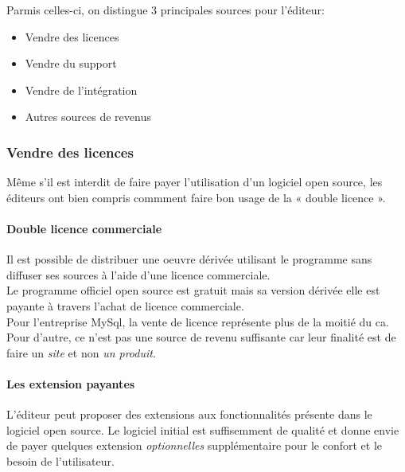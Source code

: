 			Parmis celles-ci, on distingue 3 principales sources pour l'éditeur:

			\begin{itemize}[label=\textbullet, font=\LARGE \color{burntorange}]
				\item Vendre des licences
				\item Vendre du support
				\item Vendre de l'intégration
				\item Autres sources de revenus
			\end{itemize}

			\subsubsection{Vendre des licences}

			Même s'il est interdit de faire payer l'utilisation d'un logiciel open source, les éditeurs ont bien compris commment faire bon usage de la « double licence ».

			\paragraph{Double licence commerciale\\}

			Il est possible de distribuer une oeuvre dérivée utilisant le programme sans diffuser ses sources à l'aide d'une licence commerciale.\\
			Le programme officiel open source est gratuit mais sa version dérivée elle est payante à travers l'achat de licence commerciale.\\

			Pour l'entreprise MySql, la vente de licence représente plus de la moitié du \acrfull{ca}. Pour d'autre, ce n'est pas une source de revenu suffisante car leur finalité est de faire un \textit{site} et non \textit{un produit}.

			\paragraph{Les extension payantes\\}

			L'éditeur peut proposer des extensions aux fonctionnalités présente dans le logiciel open source. Le logiciel initial est suffisemment de qualité et donne envie de payer quelques extension \textit{optionnelles} supplémentaire pour le confort et le besoin de l'utilisateur.

